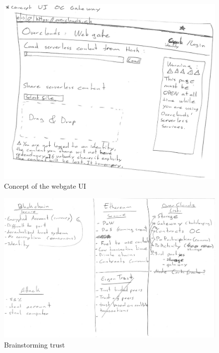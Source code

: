 \begin{figure}[htpb]
\centering
\begin{adjustbox}{center}
\includegraphics[scale=0.8]{annexes/concepts/oc-concept-webgate-ui.png}
\end{adjustbox}
\caption{Concept of the webgate UI
\label{fig:oc-concept-webgate-ui}} 
\end{figure}

\begin{figure}[htpb]
\centering
\begin{adjustbox}{center}
\includegraphics[scale=0.6]{annexes/concepts/oc-trust-brainstorming.png}
\end{adjustbox}
\caption{Brainstorming trust
\label{fig:oc-trust-brainstorming}} 
\end{figure}

